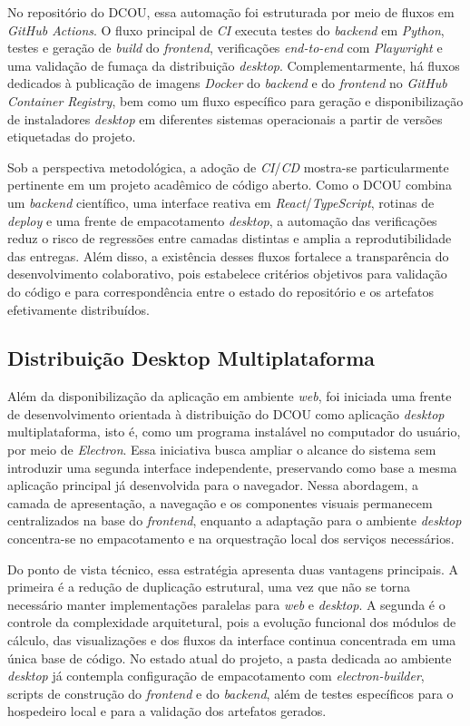 No repositório do DCOU, essa automação foi estruturada por meio de fluxos em \textit{GitHub Actions}. O fluxo principal de \textit{CI} executa testes do \textit{backend} em \textit{Python}, testes e geração de \textit{build} do \textit{frontend}, verificações \textit{end-to-end} com \textit{Playwright} e uma validação de fumaça da distribuição \textit{desktop}. Complementarmente, há fluxos dedicados à publicação de imagens \textit{Docker} do \textit{backend} e do \textit{frontend} no \textit{GitHub Container Registry}, bem como um fluxo específico para geração e disponibilização de instaladores \textit{desktop} em diferentes sistemas operacionais a partir de versões etiquetadas do projeto.

Sob a perspectiva metodológica, a adoção de \textit{CI}/\textit{CD} mostra-se particularmente pertinente em um projeto acadêmico de código aberto. Como o DCOU combina um \textit{backend} científico, uma interface reativa em \textit{React}/\textit{TypeScript}, rotinas de \textit{deploy} e uma frente de empacotamento \textit{desktop}, a automação das verificações reduz o risco de regressões entre camadas distintas e amplia a reprodutibilidade das entregas. Além disso, a existência desses fluxos fortalece a transparência do desenvolvimento colaborativo, pois estabelece critérios objetivos para validação do código e para correspondência entre o estado do repositório e os artefatos efetivamente distribuídos.

\subsection{Distribuição Desktop Multiplataforma}

Além da disponibilização da aplicação em ambiente \textit{web}, foi iniciada uma frente de desenvolvimento orientada à distribuição do DCOU como aplicação \textit{desktop} multiplataforma, isto é, como um programa instalável no computador do usuário, por meio de \textit{Electron}. Essa iniciativa busca ampliar o alcance do sistema sem introduzir uma segunda interface independente, preservando como base a mesma aplicação principal já desenvolvida para o navegador. Nessa abordagem, a camada de apresentação, a navegação e os componentes visuais permanecem centralizados na base do \textit{frontend}, enquanto a adaptação para o ambiente \textit{desktop} concentra-se no empacotamento e na orquestração local dos serviços necessários.

Do ponto de vista técnico, essa estratégia apresenta duas vantagens principais. A primeira é a redução de duplicação estrutural, uma vez que não se torna necessário manter implementações paralelas para \textit{web} e \textit{desktop}. A segunda é o controle da complexidade arquitetural, pois a evolução funcional dos módulos de cálculo, das visualizações e dos fluxos da interface continua concentrada em uma única base de código. No estado atual do projeto, a pasta dedicada ao ambiente \textit{desktop} já contempla configuração de empacotamento com \textit{electron-builder}, scripts de construção do \textit{frontend} e do \textit{backend}, além de testes específicos para o hospedeiro local e para a validação dos artefatos gerados.

